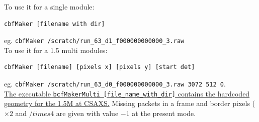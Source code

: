 \documentclass{article}
\begin{document}
To use it for a single module:
\begin{verbatim}
cbfMaker [filename with dir]
\end{verbatim}
eg.
{\tt{cbfMaker /scratch/run\_63\_d1\_f000000000000\_3.raw}}\\

To use it for a 1.5 multi modules:
\begin{verbatim}
cbfMaker [filename] [pixels x] [pixels y] [start det]
\end{verbatim}
eg.
{\tt cbfMaker /scratch/run\_63\_d0\_f000000000000\_3.raw  3072 512 0}.\\
\underline{The executable {\tt{bcfMakerMulti [file\_name\_with\_dir]}} contains the hardcoded}\\\underline{ geometry for the 1.5M at CSAXS.} 
Missing packets in a frame and border pixels ($\times 2$ and $/times 4$ are given with value $-1$ at the present mode.
\end{document}
